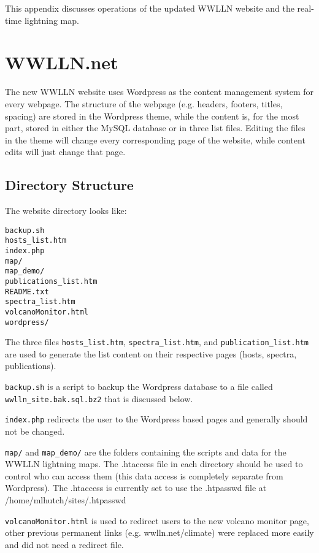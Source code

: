 This appendix discusses operations of the updated WWLLN website and the real-time lightning map.

\section{WWLLN.net}

The new WWLLN website uses Wordpress as the content management system for every webpage.
The structure of the webpage (e.g. headers, footers, titles, spacing) are stored in the Wordpress theme, while the content is, for the most part, stored in either the MySQL database or in three list files.
Editing the files in the theme will change every corresponding page of the website, while content edits will just change that page.

\subsection{Directory Structure}

The website directory looks like:

\begin{verbatim}
backup.sh
hosts_list.htm
index.php
map/
map_demo/
publications_list.htm
README.txt
spectra_list.htm
volcanoMonitor.html
wordpress/
\end{verbatim}

The three files \texttt{hosts\_list.htm}, \texttt{spectra\_list.htm}, and \texttt{publication\_list.htm} are used to generate the list content on their respective pages (hosts, spectra, publications).  

\texttt{backup.sh} is a script to backup the Wordpress database to a file called \texttt{wwlln\_site.bak.sql.bz2} that is discussed below.

\texttt{index.php} redirects the user to the Wordpress based pages and generally should not be changed.

\texttt{map/} and \texttt{map\_demo/} are the folders containing the scripts and data for the WWLLN lightning maps.
The .htaccess file in each directory should be used to control who can access them (this data access is completely separate from Wordpress).
The .htaccess is currently set to use the .htpasswd file at /home/mlhutch/sites/.htpasswd

\texttt{volcanoMonitor.html} is used to redirect users to the new volcano monitor page, other previous permanent links (e.g. wwlln.net/climate) were replaced more easily and did not need a redirect file.

